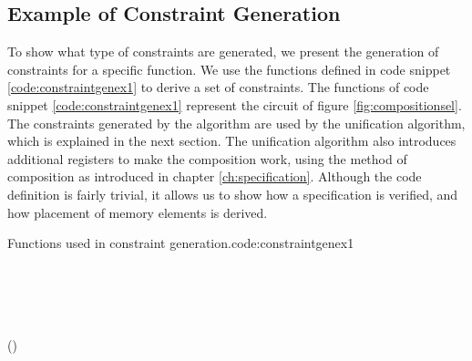 \subsection{Example of Constraint Generation}
To show what type of constraints are generated, we present the generation of constraints for a specific function.
We use the functions defined in code snippet \ref{code:constraintgenex1} to derive a set of constraints.
The functions of code snippet \ref{code:constraintgenex1} represent the circuit of figure \ref{fig:compositionsel}.
The constraints generated by the algorithm are used by the unification algorithm, which is explained in the next section.
The unification algorithm also introduces additional registers to make the composition work, using the method of composition as introduced in chapter \ref{ch:specification}.
Although the code definition is fairly trivial, it allows us to show how a specification is verified, and how placement of memory elements is derived.

\begin{texexptitled}{Functions used in constraint generation.}{code:constraintgenex1}
\begin{hscode}\SaveRestoreHook
{}%
%
\>[B]{}\mathbin{::}\langle{}\rangle\to {}\langle{}\mathbin{+}\rangle{}\<[E]%
\\
\>[B]{}\;\mathrel{=}\<[E]%
\\[\blanklineskip]%
\>[B]{}\mathbin{::}\langle{}\rangle\to {}\langle{}\rangle\to {}\langle{}\mathbin{+}\rangle\to {}\langle{}\mathbin{+}\rangle{}\<[E]%
\\
\>[B]{}\;\;\;\mathrel{=}\;\;\;\;\;\<[E]%
\\[\blanklineskip]%
\>[B]{}\;\;\mathrel{=}\;\;\;(\;){}\<[E]%
\ColumnHook
\end{hscode}\resethooks
\end{texexptitled}

